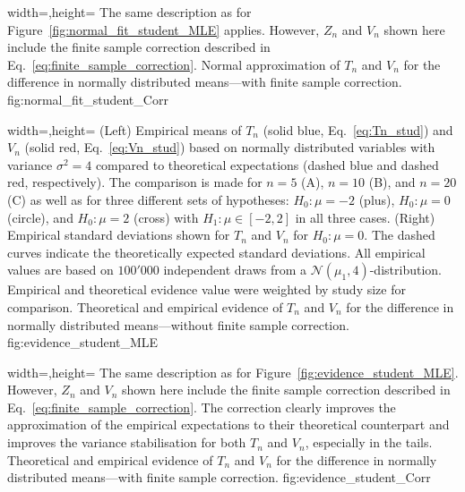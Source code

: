  {width=\textwidth,height=\textheight}%
  {The same description as for Figure~\ref{fig:normal_fit_student_MLE} applies. However, $Z_n$ and $V_n$ shown here include the finite sample correction described in Eq.~\ref{eq:finite_sample_correction}.}%
  {Normal approximation of $T_n$ and $V_n$ for the difference in normally distributed means---with finite sample correction.}%
  {fig:normal_fit_student_Corr}%

  {width=\textwidth,height=\textheight}%
  {(Left) Empirical means of $T_n$ (solid blue, Eq.~\ref{eq:Tn_stud}) and $V_n$ (solid red, Eq.~\ref{eq:Vn_stud}) based on normally distributed variables with variance ${\sigma^2 = 4}$ compared to theoretical expectations (dashed blue and dashed red, respectively). The comparison is made for $n=5$ (A), $n=10$ (B), and $n=20$ (C) as well as for three different sets of hypotheses: ${H_0: \mu = -2}$ (plus), ${H_0: \mu=0}$ (circle), and ${H_0: \mu=2}$ (cross) with ${H_1: \mu \in [-2,2]}$ in all three cases. (Right) Empirical standard deviations shown for $T_n$ and $V_n$ for ${H_0: \mu=0}$. The dashed curves indicate the theoretically expected standard deviations. All empirical values are based on $100'000$ independent draws from a $\mathcal{N}(\mu_1,4)$-distribution. Empirical and theoretical evidence value were weighted by study size for comparison.}%
  {Theoretical and empirical evidence of $T_n$ and $V_n$ for the difference in normally distributed means---without finite sample correction.}%
  {fig:evidence_student_MLE}%

  {width=\textwidth,height=\textheight}%
  {The same description as for Figure~\ref{fig:evidence_student_MLE}. However, $Z_n$ and $V_n$ shown here include the finite sample correction described in Eq.~\ref{eq:finite_sample_correction}. The correction clearly improves the approximation of the empirical expectations to their theoretical counterpart and improves the variance stabilisation for both $T_n$ and $V_n$, especially in the tails.}%
  {Theoretical and empirical evidence of $T_n$ and $V_n$ for the difference in normally distributed means---with finite sample correction.}%
  {fig:evidence_student_Corr}%

